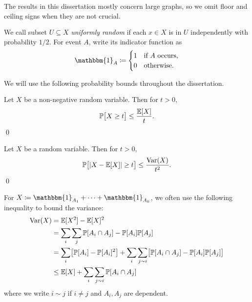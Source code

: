 The results in this dissertation mostly concern large graphs, so we omit floor and ceiling signs when they are not crucial.

We call subset $U \subseteq X$ \textit{uniformly random} if each $x \in X$ is in $U$ independently with probability $1/2$. For event $A$, write its indicator function as
\[
  \mathbbm{1}_A \coloneqq \begin{cases}
    1 & \text{if } A \text{ occurs}, \\
    0 & \text{otherwise}.
  \end{cases}
\]


We will use the following probability bounds throughout the dissertation.

\begin{proposition}
  \label{prop:markov}
  Let $X$ be a non-negative random variable. Then for $t > 0$,
  \[
    \mathbb{P}\bigl[X \geq t\bigr] \leq \frac{\mathbb{E}[X]}{t}.
  \]
  \qed
\end{proposition}


\begin{proposition}
  \label{prop:chebyshev}

  Let $X$ be a random variable. Then for $t > 0$,
  \[
    \mathbb{P}\bigl[|X - \mathbb{E}[X]| \geq t\bigr] \leq \frac{\operatorname{Var}(X)}{t^2}.
  \]
  \qed
\end{proposition}


For $X \coloneqq \mathbbm{1}_{A_1} + \cdots + \mathbbm{1}_{A_k}$, we often use the following inequality to bound the variance:
\begin{align*}
  \operatorname{Var}(X) 
  &= \mathbb{E}[X^2] - \mathbb{E}[X]^2 \\
  &= \sum_{i}\sum_j \mathbb{P}[A_i \cap A_j] - \mathbb{P}[A_i] \mathbb{P}[A_j] \\
  &= \sum_i \bigl[\mathbb{P}[A_i] - \mathbb{P}[A_i]^2\bigr] + \sum_i \sum_{j \sim i} \bigl[\mathbb{P}[A_i \cap A_j] - \mathbb{P}[A_i] \mathbb{P}[A_j]\bigr] \\
  &\leq \mathbb{E}[X] + \sum_i \sum_{j \sim i} \mathbb{P}[A_i \cap A_j]
\end{align*}
where we write $i \sim j$ if $i \neq j$ and $A_i, A_j$ are dependent.

